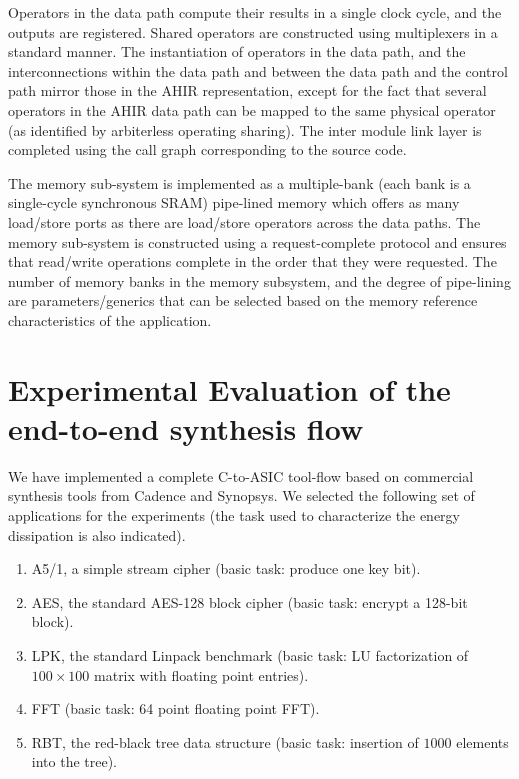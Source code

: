 \documentclass[conference]{IEEEtran}
\begin{document}
Operators in the data path compute their results in a single
clock cycle, and the outputs are registered.  Shared operators
are constructed using multiplexers in a standard manner.
The instantiation of operators in the data path, 
and the interconnections within
the data path and between the data path and the control path
mirror those in the AHIR representation, except for the fact
that several operators in the AHIR data path can be mapped
to the same physical operator (as identified by arbiterless
operating sharing).
The inter module link layer is completed using the call graph
corresponding to the source code.

The memory sub-system is implemented as a multiple-bank (each
bank is a single-cycle synchronous SRAM)
pipe-lined memory which offers as many load/store ports as
there are load/store operators across the data paths.  The memory
sub-system is constructed using a request-complete protocol and
ensures that read/write operations complete in the order
that they were requested. The number of memory banks in the memory
subsystem,
and the degree of pipe-lining are parameters/generics that
can be selected based on the memory reference characteristics
of the application.

\section{Experimental Evaluation of the end-to-end synthesis flow}

We have implemented a complete C-to-ASIC tool-flow based on commercial
synthesis tools from Cadence and Synopsys.  We selected the
following set of applications for the experiments (the task used
to characterize the energy dissipation is also indicated).
\begin{enumerate}
\item A5/1, a simple stream cipher (basic task: produce one key bit).
\item AES, the standard AES-128 block cipher (basic task: encrypt a 128-bit block).
\item LPK, the standard Linpack benchmark (basic task: LU factorization of $100\times100$ matrix with
floating point entries).
\item FFT (basic task: 64 point floating point FFT).
\item RBT, the red-black tree data structure (basic task: insertion of $1000$ elements into
the tree).
\end{enumerate}
\end{document}
